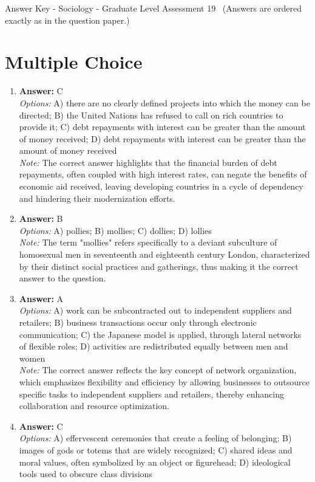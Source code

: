 \documentclass[12pt]{article}
\begin{document}
\begin{center}
Answer Key - Sociology - Graduate Level Assessment 19 \
\small (Answers are ordered exactly as in the question paper.)
\end{center}

\section*{Multiple Choice}
\begin{enumerate}[label=\arabic*.]
\item \textbf{Answer:} C
\\ \textit{Options:} A) there are no clearly defined projects into which the money can be directed; B) the United Nations has refused to call on rich countries to provide it; C) debt repayments with interest can be greater than the amount of money received; D) debt repayments with interest can be greater than the amount of money received
\\ \textit{Note:} The correct answer highlights that the financial burden of debt repayments, often coupled with high interest rates, can negate the benefits of economic aid received, leaving developing countries in a cycle of dependency and hindering their modernization efforts.
\item \textbf{Answer:} B
\\ \textit{Options:} A) pollies; B) mollies; C) dollies; D) lollies
\\ \textit{Note:} The term "mollies" refers specifically to a deviant subculture of homosexual men in seventeenth and eighteenth century London, characterized by their distinct social practices and gatherings, thus making it the correct answer to the question.
\item \textbf{Answer:} A
\\ \textit{Options:} A) work can be subcontracted out to independent suppliers and retailers; B) business transactions occur only through electronic communication; C) the Japanese model is applied, through lateral networks of flexible roles; D) activities are redistributed equally between men and women
\\ \textit{Note:} The correct answer reflects the key concept of network organization, which emphasizes flexibility and efficiency by allowing businesses to outsource specific tasks to independent suppliers and retailers, thereby enhancing collaboration and resource optimization.
\item \textbf{Answer:} C
\\ \textit{Options:} A) effervescent ceremonies that create a feeling of belonging; B) images of gods or totems that are widely recognized; C) shared ideas and moral values, often symbolized by an object or figurehead; D) ideological tools used to obscure class divisions

\end{enumerate}
\end{document}
